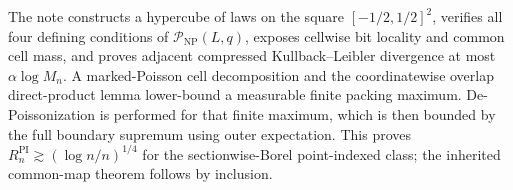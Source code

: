 The note constructs a hypercube of laws on the square \([-1/2,1/2]^2\), verifies all four defining conditions of \(\mathcal P_{\mathrm{NP}}(L,q)\), exposes cellwise bit locality and common cell mass, and proves adjacent compressed Kullback--Leibler divergence at most \(\alpha\log M_n\).  A marked-Poisson cell decomposition and the coordinatewise overlap direct-product lemma lower-bound a measurable finite packing maximum.  De-Poissonization is performed for that finite maximum, which is then bounded by the full boundary supremum using outer expectation.  This proves \(R_n^{\mathrm{PI}}\gtrsim(\log n/n)^{1/4}\) for the sectionwise-Borel point-indexed class; the inherited common-map theorem follows by inclusion.